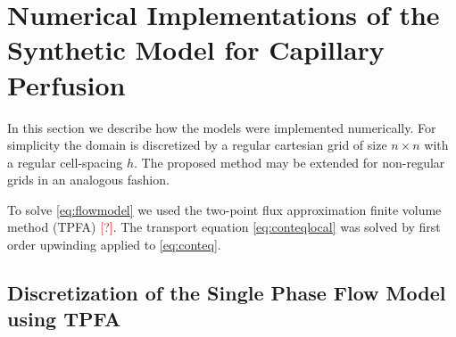 \documentclass[paper=a4, fontsize=11pt,parskip=half,headings=small]{scrartcl}
\newcommand{\missingsource}{\textcolor{red}{[?]}}
\begin{document}
	\section{Numerical Implementations of the Synthetic Model for Capillary Perfusion}
	
	In this section we describe how the models were implemented numerically.
	For simplicity the domain is discretized by a regular cartesian grid of size $n \times n$ with a regular cell-spacing $h$.
	The proposed method may be extended for non-regular grids in an analogous fashion.	

	To solve \eqref{eq:flowmodel} we used the two-point flux approximation finite volume method (TPFA) \missingsource. 
	The transport equation \eqref{eq:conteqlocal} was solved by first order upwinding \cite{Patankar80} applied to \eqref{eq:conteq}.

	\subsection{Discretization of the Single Phase Flow Model using TPFA} \label{sec:numflow}
\end{document}
